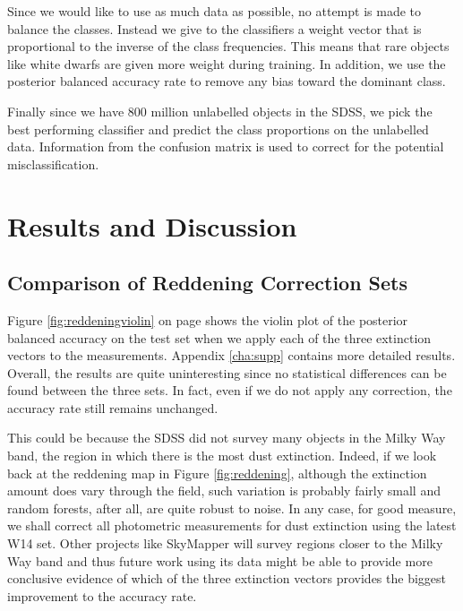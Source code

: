 Since we would like to use as much data as possible, no attempt is made to balance the classes.
Instead we give to the classifiers a weight vector that is proportional to the inverse
of the class frequencies. This means that rare objects like white dwarfs are given more
weight during training. In addition, we use the posterior balanced accuracy rate to remove
any bias toward the dominant class.

Finally since we have 800 million unlabelled objects in the SDSS, we pick the best performing
classifier and predict the class proportions on the unlabelled data. Information from the confusion
matrix is used to correct for the potential misclassification.

\section{Results and Discussion}
\label{sec:results1}

\subsection{Comparison of Reddening Correction Sets}
\label{sub:extinction}

Figure \ref{fig:reddeningviolin} on page \pageref{fig:reddeningviolin} shows the violin plot of the
posterior balanced accuracy on the test set when we apply each of the three extinction vectors to
the measurements. Appendix \ref{cha:supp} contains more detailed results. Overall, the results are
quite uninteresting since no statistical differences can be found between the three sets. In fact,
even if we do not apply any correction, the accuracy rate still remains unchanged.

This could be because the SDSS did not survey many objects in the Milky Way band, the region in
which there is the most dust extinction. Indeed, if we look back at the reddening map in Figure
\ref{fig:reddening}, although the extinction amount does vary through the field, such variation is
probably fairly small and random forests, after all, are quite robust to noise. In any case, for
good measure, we shall correct all photometric measurements for dust extinction using the latest
W14 set. Other projects like SkyMapper will survey regions closer to the Milky Way band and thus
future work using its data might be able to provide more conclusive evidence of which of the three
extinction vectors provides the biggest improvement to the accuracy rate.

